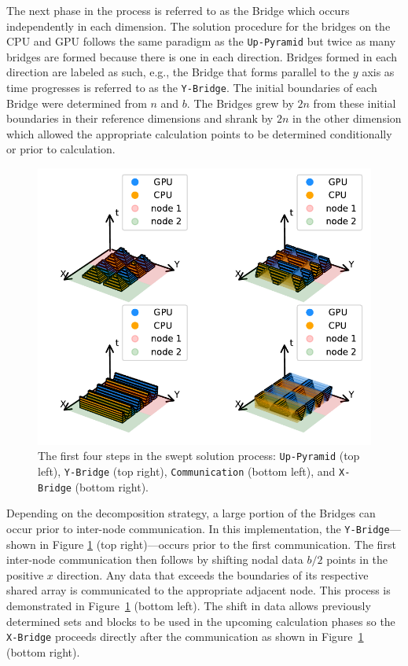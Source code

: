 \documentclass[preprints,article,accept,moreauthors,pdftex]{Definitions/mdpi}
\def\Up{\texttt{Up-Pyramid}}
\def\Xb{\texttt{X-Bridge}}
\def\Yb{\texttt{Y-Bridge}}
\newcommand\fs{0.7}
\begin{document}
\par The next phase in the process is referred to as the Bridge which occurs independently in each dimension. The solution procedure for the bridges on the CPU and GPU follows the same paradigm as the \Up{} but twice as many bridges are formed because there is one in each direction. Bridges formed in each direction are labeled as such, e.g., the Bridge that forms parallel to the $y$ axis as time progresses is referred to as the \Yb{}. The initial boundaries of each Bridge were determined from $n$ and $b$. The Bridges grew by $2n$ from these initial boundaries in their reference dimensions and shrank by $2n$ in the other dimension which allowed the appropriate calculation points to be determined conditionally or prior to calculation.

\begin{figure}[H]
    \begin{center}
        \includegraphics[scale=\fs, trim={1cm 0.6cm 0.25cm 0.2cm},clip]{figs/SubsPlot1.pdf}
    \end{center}
    \caption{The first four steps in the swept solution process: \Up{} (top left), \Yb{} (top right), \texttt{Communication} (bottom left), and \Xb{} (bottom right).}
    \label{fig:MainOne}
\end{figure}

\par
Depending on the decomposition strategy, a large portion of the Bridges can occur prior to inter-node communication. In this implementation, the \Yb{}---shown in Figure \ref{fig:MainOne} (top right)---occurs prior to the first communication. The first inter-node communication then follows by shifting nodal data $b/2$ points in the positive $x$ direction. Any data that exceeds the boundaries of its respective shared array is communicated to the appropriate adjacent node. This process is demonstrated in Figure~\ref{fig:MainOne} (bottom left). The shift in data allows previously determined sets and blocks to be used in the upcoming calculation phases so the \Xb{} proceeds directly after the communication as shown in Figure~\ref{fig:MainOne} (bottom right).
\end{document}
